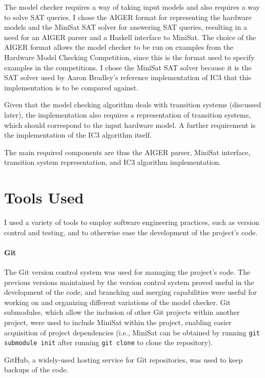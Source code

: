 \documentclass[12pt,a4paper,twoside,openright]{report}
\begin{document}
The model checker requires a way of taking input models and also
requires a way to solve SAT queries.
I chose the AIGER format for representing the hardware models and the
MiniSat SAT solver for answering SAT queries, resulting in a need for an
AIGER parser and a Haskell interface to MiniSat. The choice of
the AIGER format allows the model checker to be run on examples from
the Hardware Model Checking Competition, since this is the format used
to specify examples in the competitions. I chose the MiniSat SAT
solver because it is the SAT solver used by Aaron Bradley's reference
implementation of IC3 that this implementation is to be compared against.

Given that the model checking algorithm deals with transition systems
(discussed later), the implementation also requires a representation of
transition systems, which should correspond to the input hardware model.
A further requirement is the implementation of the
IC3 algorithm itself.

The main required components are thus the AIGER parser, MiniSat interface,
transition system representation, and IC3 algorithm implementation.

\section{Tools Used}

I used a variety of tools to employ software engineering practices, such
as version control and testing, and to otherwise ease the development of
the project's code.

\paragraph{Git}{
The Git version control system was used for managing the project's code. The
previous versions maintained by the version control system proved useful in
the development of the code, and branching and merging capabilities were
useful for working on and organizing different variations of the model checker.
Git submodules, which allow the inclusion of other Git projects within another
project, were used to include MiniSat within the project, enabling easier
acquisition of project dependencies (i.e., MiniSat can be obtained by running
\verb,git submodule init, after running \verb,git clone, to clone the repository).

GitHub, a widely-used hosting service for Git repositories, was used to keep
backups of the code.}
\end{document}
